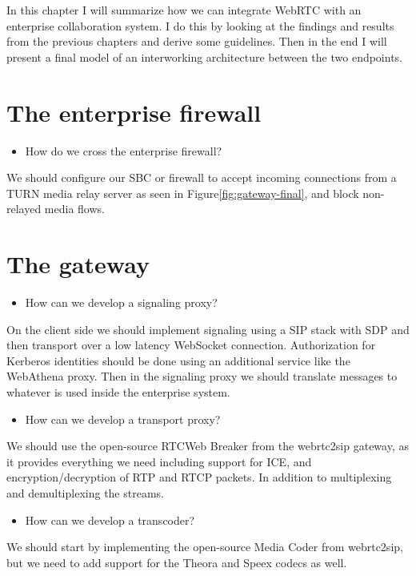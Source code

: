 In this chapter I will summarize how we can integrate WebRTC with an enterprise collaboration system. I do this by looking at the findings and results from the previous chapters and derive some guidelines. Then in the end I will present a final model of an interworking architecture between the two endpoints.

\section{The enterprise firewall}

\begin{itemize}
\item How do we cross the enterprise firewall?
\end{itemize}
We should configure our SBC or firewall to accept incoming connections from a TURN media relay server as seen in Figure\ref{fig:gateway-final}, and block non-relayed media flows.

\section{The gateway}

\begin{itemize}
\item How can we develop a signaling proxy?
\end{itemize}
On the client side we should implement signaling using a SIP stack with SDP and then transport over a low latency WebSocket connection. Authorization for Kerberos identities should be done using an additional service like the WebAthena proxy. Then in the signaling proxy we should translate messages to whatever is used inside the enterprise system.

\begin{itemize}
\item How can we develop a transport proxy?
\end{itemize}
We should use the open-source RTCWeb Breaker from the webrtc2sip gateway, as it provides everything we need including support for ICE, and encryption/decryption of RTP and RTCP packets. In addition to multiplexing and demultiplexing the streams.

\begin{itemize}
\item How can we develop a transcoder?
\end{itemize}
We should start by implementing the open-source Media Coder from webrtc2sip, but we need to add support for the Theora and Speex codecs as well.

